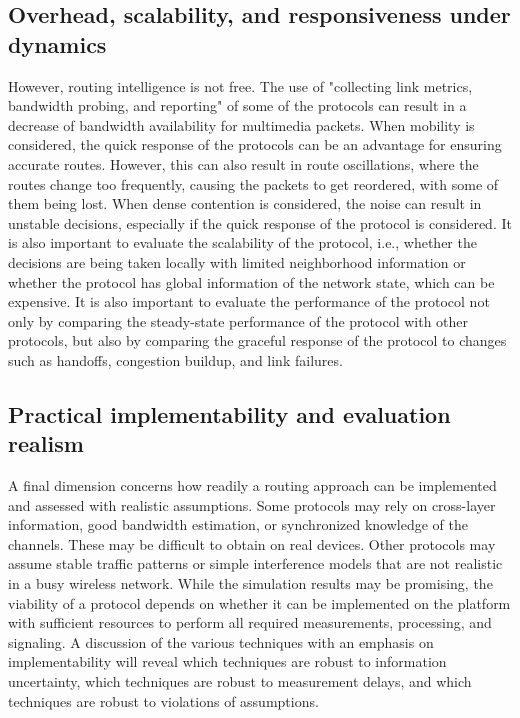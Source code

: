 \documentclass[12pt]{article}
\begin{document}
        \subsection{Overhead, scalability, and responsiveness under dynamics}
        However, routing intelligence is not free. The use of "collecting link metrics, bandwidth probing, and reporting" of some of the protocols can result in a decrease of bandwidth availability for multimedia packets. When mobility is considered, the quick response of the protocols can be an advantage for ensuring accurate routes. However, this can also result in route oscillations, where the routes change too frequently, causing the packets to get reordered, with some of them being lost. When dense contention is considered, the noise can result in unstable decisions, especially if the quick response of the protocol is considered. It is also important to evaluate the scalability of the protocol, i.e., whether the decisions are being taken locally with limited neighborhood information or whether the protocol has global information of the network state, which can be expensive. It is also important to evaluate the performance of the protocol not only by comparing the steady-state performance of the protocol with other protocols, but also by comparing the graceful response of the protocol to changes such as handoffs, congestion buildup, and link failures.
        \subsection{Practical implementability and evaluation realism}
        A final dimension concerns how readily a routing approach can be implemented and assessed with realistic assumptions. Some protocols may rely on cross-layer information, good bandwidth estimation, or synchronized knowledge of the channels. These may be difficult to obtain on real devices. Other protocols may assume stable traffic patterns or simple interference models that are not realistic in a busy wireless network. While the simulation results may be promising, the viability of a protocol depends on whether it can be implemented on the platform with sufficient resources to perform all required measurements, processing, and signaling. A discussion of the various techniques with an emphasis on implementability will reveal which techniques are robust to information uncertainty, which techniques are robust to measurement delays, and which techniques are robust to violations of assumptions.
\end{document}
